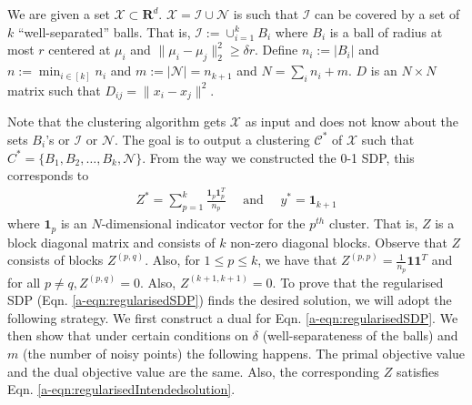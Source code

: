 \documentclass[12pt]{article}
\newcommand{\mc}{\mathcal}
\newcommand{\mb}{\mathbf}
\begin{document}
We are given a set $\mc X \subset \mb R^d$. $\mc X = \mc I \cup \mc N$ is such that $\mc I$ can be covered by a set of $k$ ``well-separated'' balls. That is, $\mc I := \cup_{i=1}^k B_i$ where $B_i$ is a ball of radius at most $r$ centered at $\mu_i$ and $\|\mu_i - \mu_j\|_{2}^{2} \ge \delta r$. %
Define $n_i := |B_i|$ and $n := \min_{i\in[k]} n_i$ and $m := |\mc N| = n_{k+1}$ and $N = \sum_i n_i + m$. $D$ is an $N\times N$ matrix such that $D_{ij} = \|x_i -x_j\|^2$.  

Note that the clustering algorithm gets $\mc X$ as input and does not know about the sets $B_i$'s or $\mc I$ or $\mc N$. The goal is to output a clustering $\mc C^*$ of $\mc X$ such that $C^* = \{B_1, B_2, \ldots, B_k, \mc N\}$. From the way we constructed the 0-1 SDP, this corresponds to
\begin{align}
  Z^* = \sum_{p=1}^k \frac{\mb 1_p \mb 1_{p}^T}{n_p} \enspace\enspace\text{ and }\enspace\enspace y^* = \mb 1_{k+1}\label{a-eqn:regularisedIntendedsolution}
\end{align}
where $\mb 1_p$ is an $N$-dimensional indicator vector for the $p^{th}$ cluster. That is, $Z$ is a block diagonal matrix and consists of $k$ non-zero diagonal blocks. Observe that $Z$ consists of blocks $Z^{(p, q)}$. Also, for $1\le p \le k$, we have that $Z^{(p, p)} = \frac{1}{n_p}\mb 1\mb 1^T$ and for all $p \neq q, Z^{(p, q)} = 0$. Also, $Z^{(k+1, k+1)} = 0$. To prove that the regularised SDP (Eqn. \ref{a-eqn:regularisedSDP}) finds the desired solution, we  will adopt the following strategy. We first construct a dual for Eqn. \ref{a-eqn:regularisedSDP}. We then show that under certain conditions on $\delta$ (well-separateness of the balls) and $m$ (the number of noisy points) the following happens. The primal objective value and the dual objective value are the same. Also, the corresponding $Z$ satisfies Eqn. \ref{a-eqn:regularisedIntendedsolution}. 
\end{document}

